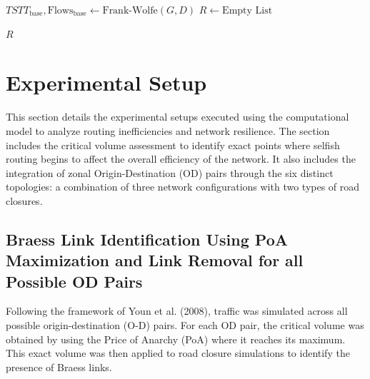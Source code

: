 \begin{algorithm}[htbp]
\small
\caption{ Edge Removal and Paradox Identification}
\label{alg:edge_removal}

\BlankLine

$TSTT_{\text{base}}, \text{Flows}_{\text{base}} \gets \text{Frank-Wolfe}(G, D)$ 
$R \gets \text{Empty List}$\;

\BlankLine
{}

\Return $R$
\end{algorithm}

\section{Experimental Setup}
\label{sec:experimental_setup}
This section details the experimental setups executed using the computational model to analyze routing inefficiencies and network resilience. The section includes the critical volume assessment to identify exact points where selfish routing begins to affect the overall efficiency of the network. It also includes the integration of zonal Origin-Destination (OD) pairs through the six distinct topologies: a combination of three network configurations with two types of road closures. 

\subsection{Braess Link Identification Using PoA Maximization and Link Removal for all Possible OD Pairs}
\label{sec:baseline_analysis}

Following the framework of Youn et al. (2008), traffic was simulated across all possible origin-destination (O-D) pairs. For each OD pair, the critical volume was obtained by using the Price of Anarchy (PoA) where it reaches its maximum. This exact volume was then applied to road closure simulations to identify the presence of Braess links. 

